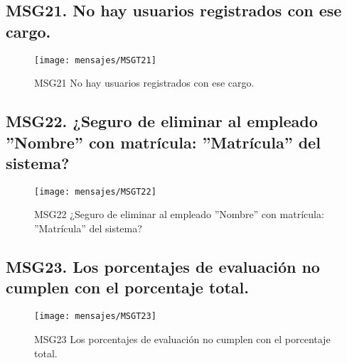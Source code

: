 \subsection{MSG21. No hay usuarios registrados con ese cargo.}
    \begin{figure}[htbp]
        \begin{center}
            \texttt{[image: mensajes/MSGT21]}
            \caption{MSG21 No hay usuarios registrados con ese cargo.}
            \label{fig:MSG21}
        \end{center}
    \end{figure}


\subsection{MSG22. ¿Seguro de eliminar al empleado ''Nombre'' con matrícula: ''Matrícula'' del sistema?}
    \begin{figure}[htbp]
        \begin{center}
            \texttt{[image: mensajes/MSGT22]}
            \caption{MSG22 ¿Seguro de eliminar al empleado ''Nombre'' con matrícula: ''Matrícula'' del sistema?}
            \label{fig:MSG22}
        \end{center}
    \end{figure}
    
\subsection{MSG23. Los porcentajes de evaluación no cumplen con el porcentaje total.}
    \begin{figure}[htbp]
        \begin{center}
            \texttt{[image: mensajes/MSGT23]}
            \caption{ MSG23 Los porcentajes de evaluación no cumplen con el porcentaje total.}
            \label{fig:MSG21}
        \end{center}
    \end{figure}

